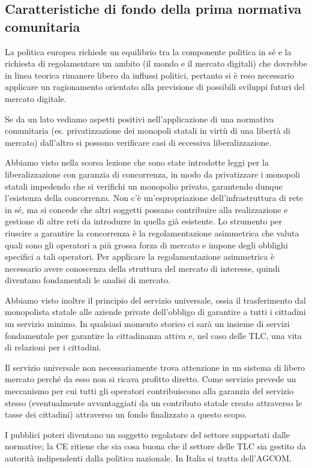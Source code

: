 \subsection{Caratteristiche di fondo della prima normativa comunitaria}

La politica europea richiede un equilibrio tra la componente politica in sé e la richiesta di regolamentare un ambito (il mondo e il mercato digitali) che dovrebbe in linea teorica rimanere libero da influssi politici, pertanto si è reso necessario applicare un ragionamento orientato alla previsione di possibili sviluppi futuri del mercato digitale.

Se da un lato vediamo aspetti positivi nell'applicazione di una normativa comunitaria (es. privatizzazione dei monopoli statali in virtù di una libertà di mercato) dall'altro si possono verificare casi di eccessiva liberalizzazione. 

Abbiamo visto nella scorsa lezione che sono state introdotte leggi per la liberalizzazione con garanzia di concorrenza, in modo da privatizzare i monopoli statali impedendo che si verifichi un monopolio privato, garantendo dunque l'esistenza della concorrenza. 
Non c'è un'espropriazione dell'infrastruttura di rete in sé, ma si concede che altri soggetti possano contribuire alla realizzazione e gestione di altre reti da introdurre in quella già esistente. 
Lo strumento per riuscire a garantire la concorrenza è la regolamentazione asimmetrica che valuta quali sono gli operatori a più grossa forza di mercato e impone degli obblighi specifici a tali operatori. Per applicare la regolamentazione asimmetrica è necessario avere conoscenza della struttura del mercato di interesse, quindi diventano fondamentali le analisi di mercato. 

Abbiamo visto inoltre il principio del servizio universale, ossia il trasferimento dal monopolista statale alle aziende private dell'obbligo di garantire a tutti i cittadini un servizio minimo. In qualsiasi momento storico ci sarà un insieme di servizi fondamentale per garantire la cittadinanza attiva e, nel caso delle TLC, una vita di relazioni per i cittadini. 

Il servizio universale non necessariamente trova attenzione in un sistema di libero mercato perché da esso non si ricava profitto diretto. Come servizio prevede un meccanismo per cui tutti gli operatori contribuiscono alla garanzia del servizio stesso (eventualmente avvantaggiati da un contributo statale creato attraverso le tasse dei cittadini) attraverso un fondo finalizzato a questo scopo. 

I pubblici poteri diventano un soggetto regolatore del settore supportati dalle normative; la CE ritiene che sia cosa buona che il settore delle TLC sia gestito da autorità indipendenti dalla politica nazionale. In Italia si tratta dell'AGCOM.